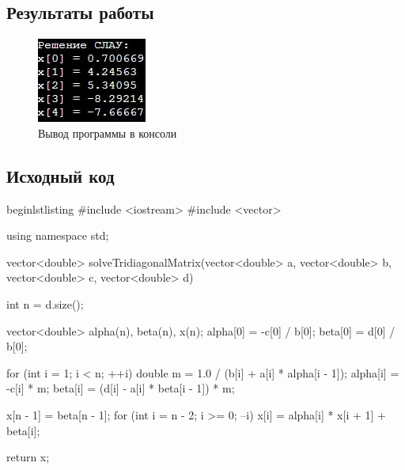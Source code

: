 \subsection{Результаты работы}
\begin{figure}[h!]
\centering
\includegraphics[width=.7\textwidth]{img/img2}
\caption{Вывод программы в консоли}
\end{figure}
\pagebreak


\subsection{Исходный код}
begin{lstlisting}
#include <iostream>
#include <vector>

using namespace std;

vector<double> solveTridiagonalMatrix(vector<double> a, vector<double> b, vector<double> c, vector<double> d) {
    int n = d.size();

    vector<double> alpha(n), beta(n), x(n);
    alpha[0] = -c[0] / b[0];
    beta[0] = d[0] / b[0];

    for (int i = 1; i < n; ++i) {
        double m = 1.0 / (b[i] + a[i] * alpha[i - 1]);
        alpha[i] = -c[i] * m;
        beta[i] = (d[i] - a[i] * beta[i - 1]) * m;
    }

    x[n - 1] = beta[n - 1];
    for (int i = n - 2; i >= 0; --i) {
        x[i] = alpha[i] * x[i + 1] + beta[i];
    }

    return x;
}

